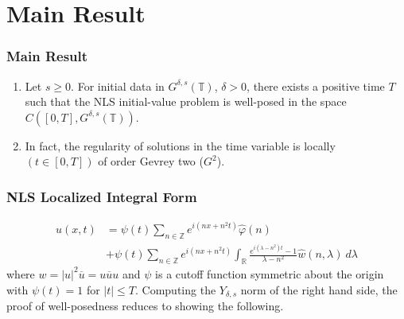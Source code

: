 \documentclass{beamer}
\numberwithin{equation}{section}
\begin{document}
\section{Main Result}
\begin{frame}
  \frametitle{Main Result}
%
\begin{theorem}
  \begin{enumerate}
%
\item
Let $s\ge 0$. For initial data in $G^{\delta,s}(\mathbb{T})$, $\delta >0$,
there exists a positive time $T$ such that the NLS initial-value problem
is well-posed in the space $C([0,T], G^{\delta,s}(\mathbb{T}))$.
%
\pause
\item
In fact, the regularity of solutions in the time variable is locally $(t \in [0,
T])$ of order Gevrey two ($G^2$).
\end{enumerate}
%
\end{theorem}
\end{frame}
%
\begin{frame}
  \frametitle{NLS Localized Integral Form}
\begin{equation*}
  \begin{split}
u(x,t) & =
 \psi(t) \underset{n\in \mathbb{Z}}{\sum} e^{i(nx +n^2t)}  \widehat{\varphi} (n)
\\
& + \psi(t) \underset{n\in \mathbb{Z}}{\sum} e^{i(nx+n^2t)}  \int_{\mathbb{R}}
\frac{e^{i(\lambda-n^2 )t}-1}{\lambda-n^2}
\widehat{w}(n,\lambda) \ d \lambda
\end{split}
\end{equation*}
where $w=|u|^2\overline{u}=u\overline{u}u$ and 
$\psi$ is a cutoff function symmetric about the origin with
$\psi(t)=1$ for $| t | \le T$. Computing the $Y_{\delta,s}$ norm of the right
hand side, the proof of well-posedness reduces to showing the following.
\end{frame}
\end{document}
